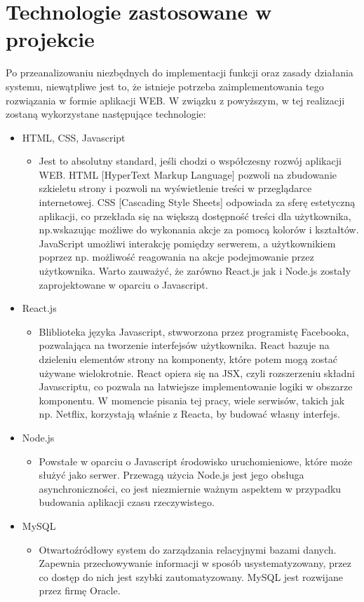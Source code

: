 \section{Technologie zastosowane w projekcie}
Po przeanalizowaniu niezbędnych do implementacji funkcji oraz zasady działania systemu, niewątpliwe jest to, że istnieje potrzeba zaimplementowania tego rozwiązania w formie aplikacji WEB. W związku z powyższym, w tej realizacji zostaną wykorzystane następujące technologie:
\begin{itemize}
    \item HTML, CSS, Javascript
        \begin{itemize}
            \item[] Jest to absolutny standard, jeśli chodzi o współczesny rozwój aplikacji WEB. HTML [HyperText Markup Language] pozwoli na zbudowanie szkieletu strony i pozwoli na wyświetlenie treści w przeglądarce internetowej. CSS [Cascading Style Sheets] odpowiada za sferę estetyczną aplikacji, co przekłada się na większą dostępność treści dla użytkownika, np.wskazując możliwe do wykonania akcje za pomocą kolorów i kształtów. JavaScript umożliwi interakcję pomiędzy serwerem, a użytkownikiem poprzez np. możliwość reagowania na akcje podejmowanie przez użytkownika. Warto zauważyć, że zarówno React.js jak i Node.js zostały zaprojektowane w oparciu o Javascript.
        \end{itemize}
    \item React.js
        \begin{itemize}
            \item[] Bliblioteka języka Javascript, stwworzona przez programistę Facebooka, pozwalająca na tworzenie interfejsów użytkownika. React bazuje na dzieleniu elementów strony na komponenty, które potem mogą zostać używane wielokrotnie. React opiera się na JSX, czyli rozszerzeniu składni Javascriptu, co pozwala na łatwiejsze implementowanie logiki w obszarze komponentu. W momencie pisania tej pracy, wiele serwisów, takich jak np. Netflix, korzystają właśnie z Reacta, by budować własny interfejs.
        \end{itemize}
    \item Node.js
        \begin{itemize}
            \item[] Powstałe w oparciu o Javascript środowisko uruchomieniowe, które może służyć jako serwer. Przewagą użycia Node.js jest jego obsługa asynchroniczności, co jest niezmiernie ważnym aspektem w przypadku budowania aplikacji czasu rzeczywistego.
        \end{itemize}
    \item MySQL
        \begin{itemize}
            \item[] Otwartoźródłowy system do zarządzania relacyjnymi bazami danych. Zapewnia przechowywanie informacji w sposób usystematyzowany, przez co dostęp do nich jest szybki zautomatyzowany. MySQL jest rozwijane przez firmę Oracle.
        \end{itemize}
\end{itemize}

